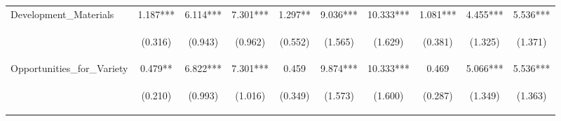 \begin{tabular}{lccccccccc}
\noalign{\smallskip}Development_Materials & 1.187*** & 6.114*** & 7.301*** & 1.297** & 9.036*** & 10.333*** & 1.081*** & 4.455*** & 5.536***\\
 & \begin{footnotesize}(0.316)\end{footnotesize} & \begin{footnotesize}(0.943)\end{footnotesize} & \begin{footnotesize}(0.962)\end{footnotesize} & \begin{footnotesize}(0.552)\end{footnotesize} & \begin{footnotesize}(1.565)\end{footnotesize} & \begin{footnotesize}(1.629)\end{footnotesize} & \begin{footnotesize}(0.381)\end{footnotesize} & \begin{footnotesize}(1.325)\end{footnotesize} & \begin{footnotesize}(1.371)\end{footnotesize}\\
\noalign{\smallskip}Opportunities_for_Variety & 0.479** & 6.822*** & 7.301*** & 0.459 & 9.874*** & 10.333*** & 0.469 & 5.066*** & 5.536***\\
 & \begin{footnotesize}(0.210)\end{footnotesize} & \begin{footnotesize}(0.993)\end{footnotesize} & \begin{footnotesize}(1.016)\end{footnotesize} & \begin{footnotesize}(0.349)\end{footnotesize} & \begin{footnotesize}(1.573)\end{footnotesize} & \begin{footnotesize}(1.600)\end{footnotesize} & \begin{footnotesize}(0.287)\end{footnotesize} & \begin{footnotesize}(1.349)\end{footnotesize} & \begin{footnotesize}(1.363)\end{footnotesize}\\

\end{tabular}
